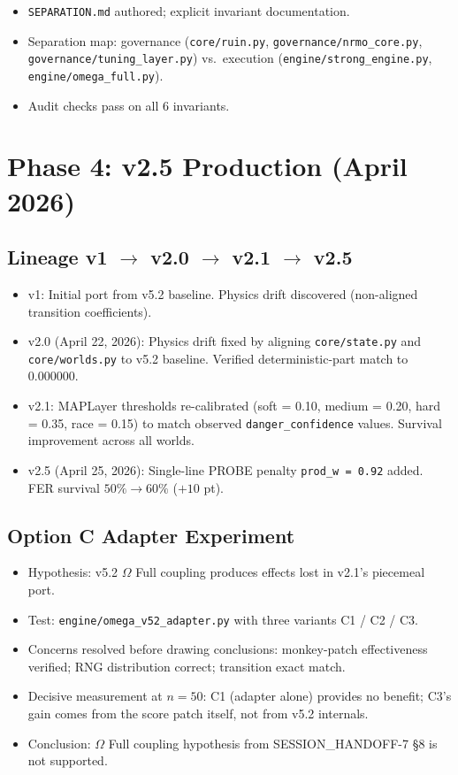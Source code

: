 \begin{itemize}
\item \texttt{SEPARATION.md} authored; explicit invariant
documentation.
\item {\raggedright Separation map: governance (\texttt{core/ruin.py},
\texttt{governance/nrmo\_core.py},
\texttt{governance/tuning\_layer.py}) vs.~execution
(\texttt{engine/strong\_engine.py},
\texttt{engine/omega\_full.py}).\par}
\item Audit checks pass on all 6 invariants.
\end{itemize}

\section{Phase 4: v2.5 Production (April 2026)}
\label{sec:session-log-phase-4}

\subsection*{Lineage v1 $\to$ v2.0 $\to$ v2.1 $\to$ v2.5}

\begin{itemize}
\item v1: Initial port from v5.2 baseline. Physics drift discovered
(non-aligned transition coefficients).
\item v2.0 (April 22, 2026): Physics drift fixed by aligning
\texttt{core/state.py} and \texttt{core/worlds.py} to v5.2
baseline. Verified deterministic-part match to 0.000000.
\item v2.1: MAPLayer thresholds re-calibrated (soft = 0.10,
medium = 0.20, hard = 0.35, race = 0.15) to match observed
\texttt{danger\_confidence} values. Survival improvement
across all worlds.
\item v2.5 (April 25, 2026): Single-line PROBE penalty
\texttt{prod\_w = 0.92} added. FER survival
$50\% \to 60\%$ ($+10$ pt).
\end{itemize}

\subsection*{Option C Adapter Experiment}

\begin{itemize}
\item Hypothesis: v5.2 $\Omega$ Full coupling produces effects lost
in v2.1's piecemeal port.
\item Test: \texttt{engine/omega\_v52\_adapter.py} with three
variants C1 / C2 / C3.
\item Concerns resolved before drawing conclusions:
monkey-patch effectiveness verified; RNG distribution correct;
transition exact match.
\item Decisive measurement at $n = 50$: C1 (adapter alone) provides
no benefit; C3's gain comes from the score patch itself, not from
v5.2 internals.
\item Conclusion: $\Omega$ Full coupling hypothesis from
SESSION\_HANDOFF-7 \S 8 is not supported.
\end{itemize}

